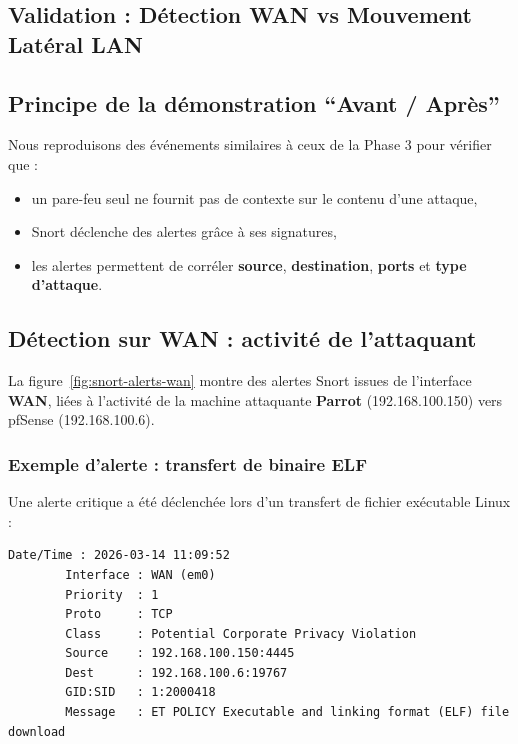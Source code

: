 \documentclass[12pt,a4paper,openany]{report}
\begin{document}
	\subsection{Validation : Détection WAN vs Mouvement Latéral LAN}
	
	\subsection{Principe de la démonstration ``Avant / Après''}
	
	Nous reproduisons des événements similaires à ceux de la Phase 3 pour vérifier que :
	\begin{itemize}
		\item un pare-feu seul ne fournit pas de contexte sur le contenu d'une attaque,
		\item Snort déclenche des alertes grâce à ses signatures,
		\item les alertes permettent de corréler \textbf{source}, \textbf{destination}, \textbf{ports} et \textbf{type d'attaque}.
	\end{itemize}
	
	\subsection{Détection sur WAN : activité de l'attaquant}
	
	La figure~\ref{fig:snort-alerts-wan} montre des alertes Snort issues de l'interface \textbf{WAN}, liées à l'activité de la machine attaquante \textbf{Parrot} (192.168.100.150) vers pfSense (192.168.100.6).
	
	\subsubsection{Exemple d'alerte : transfert de binaire ELF}
	
	Une alerte critique a été déclenchée lors d'un transfert de fichier exécutable Linux :
	
	\begin{lstlisting}[style=logstyle,caption={Extrait d'alerte WAN : détection d'un téléchargement ELF (ET POLICY)},label={lst:alert-elf}]
		Date/Time : 2026-03-14 11:09:52
		Interface : WAN (em0)
		Priority  : 1
		Proto     : TCP
		Class     : Potential Corporate Privacy Violation
		Source    : 192.168.100.150:4445
		Dest      : 192.168.100.6:19767
		GID:SID   : 1:2000418
		Message   : ET POLICY Executable and linking format (ELF) file download
	\end{lstlisting}
	
\end{document}
